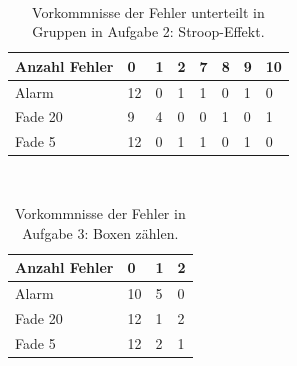 \begin{table}
	\caption{Vorkommnisse der Fehler unterteilt in Gruppen in Aufgabe 2: Stroop-Effekt.}~\label{tab:matchingMistakeNumbers}
	
	\setlength\tabcolsep{3pt}
	\renewcommand{\arraystretch}{1.4}%
	\begin{tabularx}{\textwidth}{ | l | x | x | x | x | x | x | x | }
		\hline
		Anzahl Fehler & 0   & 1  & 2  & 7  & 8  & 9 & 10 \\ \hline\hline
		Alarm 	  & 12  & 0  & 1  & 1  & 0  & 1 & 0  \\ \hline
		Fade 20   & 9  & 4  & 0  & 0  & 1  & 0 & 1  \\ \hline
		Fade 5 	  & 12  & 0  & 1  & 1  & 0  & 1 & 0  \\ \hline
	\end{tabularx}
\end{table}

\begin{table}
	\caption{Vorkommnisse der Fehler in Aufgabe 3: Boxen zählen.}~\label{tab:countingMistakeNumbers}
	
	\setlength\tabcolsep{3pt}
	\renewcommand{\arraystretch}{1.4}%
	\begin{tabularx}{\textwidth}{ | l | x | x | x | }
		\hline
		Anzahl Fehler & 0   & 1  & 2 \\ \hline\hline
		Alarm 	  & 10  & 5  & 0 \\ \hline
		Fade 20   & 12  & 1  & 2 \\ \hline
		Fade 5 	  & 12  & 2  & 1 \\ \hline
	\end{tabularx}
\end{table}


